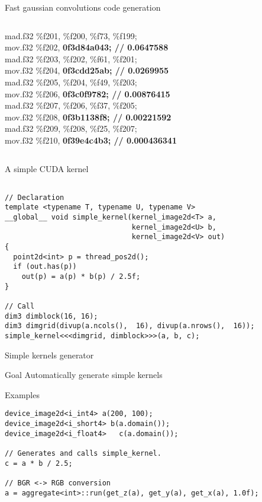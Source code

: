 \documentclass{beamer}
\begin{document}
\begin{frame}[containsverbatim]{Fast gaussian convolutions code generation}
\begin{columns}
\begin{column}[r]{5cm}
{mad.f32 	\%f201, \%f200, \%f73, \%f199;\\
mov.f32 	\%f202, \textbf{0f3d84a043;   	// 0.0647588} \\
mad.f32 	\%f203, \%f202, \%f61, \%f201;\\
mov.f32 	\%f204, \textbf{0f3cdd25ab;   	// 0.0269955} \\
mad.f32 	\%f205, \%f204, \%f49, \%f203;\\
mov.f32 	\%f206, \textbf{0f3c0f9782;   	// 0.00876415} \\
mad.f32 	\%f207, \%f206, \%f37, \%f205;\\
mov.f32 	\%f208, \textbf{0f3b1138f8;   	// 0.00221592} \\
mad.f32 	\%f209, \%f208, \%f25, \%f207;\\
mov.f32 	\%f210, \textbf{0f39e4c4b3;   	// 0.000436341}}
\end{column}
\end{columns}

\end{frame}

\begin{frame}[containsverbatim]{A simple CUDA kernel}

\begin{lstlisting}

// Declaration
template <typename T, typename U, typename V>
__global__ void simple_kernel(kernel_image2d<T> a,
                              kernel_image2d<U> b,
                              kernel_image2d<V> out)
{
  point2d<int> p = thread_pos2d();
  if (out.has(p))
    out(p) = a(p) * b(p) / 2.5f;
}

// Call
dim3 dimblock(16, 16);
dim3 dimgrid(divup(a.ncols(),  16), divup(a.nrows(),  16));
simple_kernel<<<dimgrid, dimblock>>>(a, b, c);
\end{lstlisting}

\end{frame}

\begin{frame}[containsverbatim]{Simple kernels generator}

  \begin{block}{Goal}
  Automatically generate simple kernels
  \end{block}

\begin{block}{Examples}
\begin{lstlisting}
device_image2d<i_int4> a(200, 100);
device_image2d<i_short4> b(a.domain());
device_image2d<i_float4>   c(a.domain());

// Generates and calls simple_kernel.
c = a * b / 2.5;

// BGR <-> RGB conversion
a = aggregate<int>::run(get_z(a), get_y(a), get_x(a), 1.0f);
\end{lstlisting}
\end{block}
\end{frame}
\end{document}
